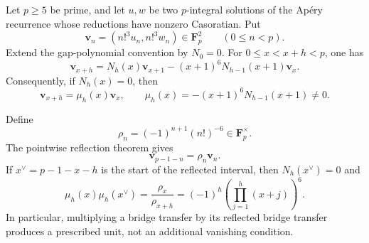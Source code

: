 \begin{proposition}
\label{prop:bridge-reflection-reciprocity}
Let $p\ge5$ be prime, and let $u,w$ be two $p$-integral solutions of the
Ap\'ery recurrence whose reductions have nonzero Casoratian.  Put
\[
 \mathbf v_n=(n!^3u_n,n!^3w_n)\in\mathbf F_p^2
 \qquad(0\le n<p).
\]
Extend the gap-polynomial convention by $N_0=0$.  For
$0\le x<x+h<p$, one has
\begin{equation}
 \mathbf v_{x+h}
 =N_h(x)\mathbf v_{x+1}
  -(x+1)^6N_{h-1}(x+1)\mathbf v_x.
\label{eq:bridge-return-expansion}
\end{equation}
Consequently, if $N_h(x)=0$, then
\begin{equation}
 \mathbf v_{x+h}=\mu_h(x)\mathbf v_x,
 \qquad
 \mu_h(x)=-(x+1)^6N_{h-1}(x+1)\ne0.
\label{eq:bridge-return-multiplier}
\end{equation}

Define
\[
 \rho_n=(-1)^{n+1}(n!)^{-6}\in\mathbf F_p^\times.
\]
The pointwise reflection theorem gives
\begin{equation}
 \mathbf v_{p-1-n}=\rho_n\mathbf v_n.
\label{eq:bridge-row-reflection}
\end{equation}
If $x^\vee=p-1-x-h$ is the start of the reflected interval, then
$N_h(x^\vee)=0$ and
\begin{equation}
 \boxed{
 \mu_h(x)\mu_h(x^\vee)
 =\frac{\rho_x}{\rho_{x+h}}
 =(-1)^h\left(\prod_{j=1}^h(x+j)\right)^6.}
\label{eq:bridge-multiplier-reciprocity}
\end{equation}
In particular, multiplying a bridge transfer by its reflected bridge
transfer produces a prescribed unit, not an additional vanishing
condition.
\end{proposition}

